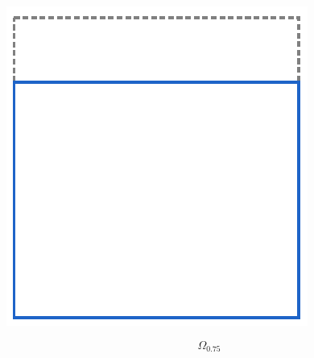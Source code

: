 \documentclass[crop, fleqn]{standalone}
\begin{document}
\begin{minipage}{60pt}
    \includegraphics[width=\linewidth]{main-theorem/rho-2.pdf}

    \vspace*{-30pt}

    \[ \Omega_{0.75} \]

    \vspace*{2pt}
\end{minipage}
\hspace{3pt}
\end{document}
